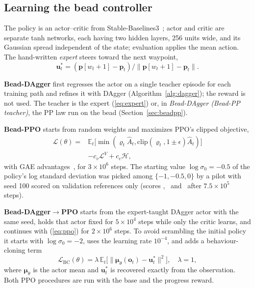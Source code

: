 \documentclass{IJCAS}
\begin{document}
\subsection{Learning the bead controller}\label{sec:learning}
The policy is an actor--critic from Stable-Baselines3~\cite{raffin2021}; actor and critic are separate tanh networks, each having two hidden layers, 256 units wide, and its Gaussian spread independent of the state; evaluation applies the mean action. The hand-written \emph{expert} steers toward the next waypoint,
\begin{equation}
\mathbf{u}^{*}_t=(\mathbf{p}[w_t+1]-\mathbf{p}_t)/\|\mathbf{p}[w_t+1]-\mathbf{p}_t\|.\label{eq:expert}
\end{equation}

\textbf{Bead-DAgger} first regresses the actor on a single teacher episode for each training path and refines it with DAgger (Algorithm~\ref{alg:dagger}); the reward is not used. The teacher is the expert (\ref{eq:expert}) or, in \emph{Bead-DAgger (Bead-PP teacher)}, the PP law run on the bead (Section~\ref{sec:beadpp}).

\textbf{Bead-PPO} starts from random weights and maximizes PPO's clipped objective,
\begin{equation}
\begin{aligned}
\mathcal{L}(\theta)={}&\mathbb{E}_t\big[\min(\varrho_t\hat A_t,\mathrm{clip}(\varrho_t,1\pm\epsilon)\hat A_t)\big]\\
&-c_v\mathcal{L}^{V}+c_e\mathcal{H},
\end{aligned}\label{eq:ppo}
\end{equation}
with GAE advantages~\cite{schulman2016}, for $3\times10^6$ steps. The starting value $\log\sigma_0=-0.5$ of the policy's log standard deviation was picked among $\{-1,-0.5,0\}$ by a pilot with seed 100 scored on validation references only (scores \VpilotPmscore, \VpilotPhscore\ and \VpilotPzscore\ after $7.5\times10^5$ steps).

\textbf{Bead-DAgger$\to$PPO} starts from the expert-taught DAgger actor with the same seed, holds that actor fixed for $5\times10^4$ steps while only the critic learns, and continues with (\ref{eq:ppo}) for $2\times10^6$ steps. To avoid scrambling the initial policy it starts with $\log\sigma_0=-2$, uses the learning rate $10^{-4}$, and adds a behaviour-cloning term
\begin{equation}
\mathcal{L}_{\mathrm{BC}}(\theta)=\lambda\,\mathbb{E}_t\big[\|\boldsymbol{\mu}_\theta(\mathbf{o}_t)-\mathbf{u}^{*}_t\|^2\big],\quad\lambda=1,\label{eq:bc}
\end{equation}
where $\boldsymbol{\mu}_\theta$ is the actor mean and $\mathbf{u}^{*}_t$ is recovered exactly from the observation. Both PPO procedures are run with the base and the progress reward.
\end{document}
